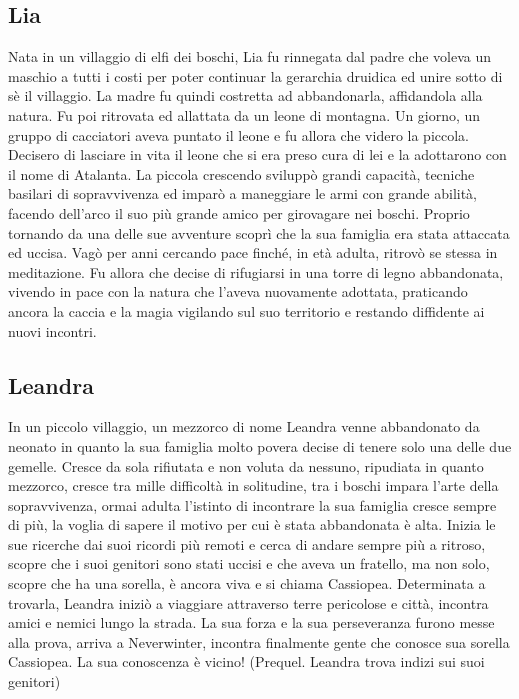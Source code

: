\documentclass{article}
\begin{document}
          \subsection{Lia}Nata in un villaggio di elfi dei boschi, Lia fu rinnegata dal padre che voleva un maschio a tutti i costi per poter continuar la gerarchia druidica ed unire sotto di sè il villaggio. La madre fu quindi costretta  ad abbandonarla, affidandola alla natura. Fu poi ritrovata ed allattata da un leone di montagna. Un giorno, un gruppo di cacciatori aveva puntato il leone e fu allora che videro la piccola. Decisero di lasciare in vita il leone che si era preso cura di lei e la adottarono con il nome di Atalanta. La piccola crescendo sviluppò grandi capacità, tecniche basilari di sopravvivenza ed imparò a maneggiare le armi con grande abilità, facendo dell'arco il suo più grande amico per girovagare nei boschi. Proprio tornando da una delle sue avventure scoprì che la sua famiglia era stata attaccata ed uccisa. Vagò per anni cercando pace finché, in età adulta, ritrovò se stessa in meditazione. Fu allora che  decise di rifugiarsi in una torre di legno abbandonata, vivendo in pace con la natura che l'aveva nuovamente  adottata, praticando ancora la caccia e la magia vigilando sul suo territorio e restando diffidente ai nuovi incontri.
          \subsection{Leandra}In un piccolo villaggio, un mezzorco di nome Leandra venne abbandonato da neonato in quanto la sua famiglia molto povera decise di tenere solo una delle due gemelle. Cresce da sola rifiutata e non voluta da nessuno, ripudiata in quanto mezzorco, cresce tra mille difficoltà in solitudine, tra i boschi impara l'arte della sopravvivenza, ormai adulta l'istinto di incontrare la sua famiglia cresce sempre di più, la voglia di sapere il motivo per cui è stata abbandonata è alta. Inizia le sue ricerche dai suoi ricordi più remoti e cerca di andare sempre più a ritroso, scopre che i suoi genitori sono stati uccisi e che aveva un fratello, ma non solo, scopre che ha una sorella, è ancora viva e si chiama Cassiopea. Determinata a trovarla, Leandra iniziò a viaggiare attraverso terre pericolose e città, incontra amici e nemici lungo la strada. La sua forza e la sua perseveranza furono messe alla prova, arriva a Neverwinter, incontra  finalmente gente che conosce sua sorella Cassiopea. La sua conoscenza è vicino! (Prequel. Leandra trova indizi sui suoi genitori)
\end{document}
